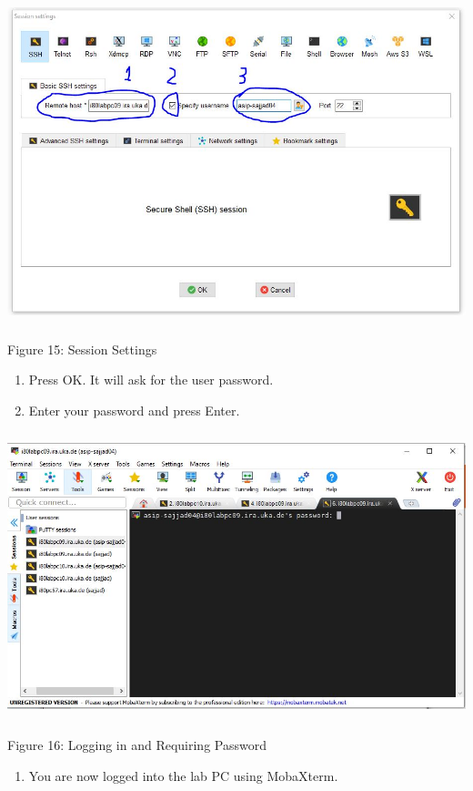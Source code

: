 \documentclass{article}
\begin{document}
\includegraphics[width=5.53861in,height=3.70864in]{images/media/image15.JPG}

Figure 15: Session Settings

\begin{enumerate}
\def\labelenumi{\arabic{enumi}.}
\setcounter{enumi}{4}
\item
  Press OK. It will ask for the user password.
\item
  Enter your password and press Enter.
\end{enumerate}

\includegraphics[width=5.67963in,height=3.28535in]{images/media/image16.JPG}

Figure 16: Logging in and Requiring Password

\begin{enumerate}
\def\labelenumi{\arabic{enumi}.}
\setcounter{enumi}{6}
\item
  You are now logged into the lab PC using MobaXterm.
\end{enumerate}
\end{document}
